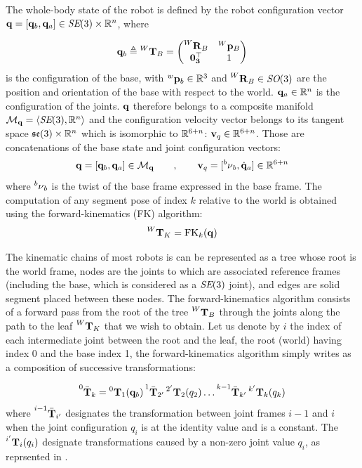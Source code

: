 The whole-body state of the robot is defined by the robot configuration vector ${\bf q}=[{\bf q}_b,{\bf q}_a]\in \textit{SE}(3) \times \mathbb{R}^n$, where 

\begin{equation}
    {\bf q}_b \triangleq \prescript{W}{}{{\bf T}}_{B} =  
    \begin{pmatrix}
        \prescript{W}{}{{\bf R}}_{B} & \prescript{W}{}{{\bf p}}_{B} \\
        \bf0_3^{\top} & 1
    \end{pmatrix}
\end{equation}
%
is the configuration of the base,
with $\prescript{w}{}{{\bf p}}_{b} \in \mathbb{R}^3$ and $\prescript{W}{}{{\bf R}}_{B} \in \textit{SO}(3)$ are the position and orientation of the base with respect to the world.
${\bf q}_a \in \mathbb{R}^n$ is the configuration of the joints. ${\bf q}$ therefore belongs to a composite manifold $\mathcal{M}_{{\bf q}} = \left<\textit{SE}(3), \mathbb{R}^n \right>$ and the configuration velocity vector belongs to its tangent space ${\mathfrak {se}}(3)\times \mathbb{R}^n$ which is isomorphic to $\mathbb{R}^{6+n}$: ${\bf v}_q \in \mathbb{R}^{6+n}$. Those are concatenations
of the base state and joint configuration vectors:
%
\begin{equation}
    {\bf q}= [{\bf q}_b, {\bf q}_a]\in \mathcal{M}_{{\bf q}}\quad\quad,
    \quad\quad
    {\bf v}_q= [\prescript{b}{}{\mathbf{\nu}}_b,\dot{{\bf q}}_a]  \in \mathbb{R}^{6+n}
    \label{eq:configuration}
\end{equation}
%
where $\prescript{b}{}{\mathbf{\nu}}_b$ is the twist of the base frame expressed in the base frame.
The computation of any segment pose of index $k$ relative to the world is obtained using the forward-kinematics (FK) algorithm:
%
\begin{equation}
    \prescript{W}{}{{\bf T}}_{K} = \text{FK}_k({\bf q})
\end{equation}

The kinematic chains of most robots is can be represented as a tree whose root is the world frame, nodes are the joints to which are associated reference frames (including the base, which is considered as a $\textit{SE}(3)$ joint), and edges are solid segment placed between these nodes.
The forward-kinematics algorithm consists of a forward pass from the root of the tree $\prescript{W}{}{{\bf T}}_{B}$ through the joints along the path to the leaf $\prescript{W}{}{{\bf T}}_{K}$ that we wish to obtain. Let us denote by $i$ the index of each intermediate joint between the root and the leaf, the root (world) having index 0 and the base index 1, the forward-kinematics algorithm simply writes as a composition of successive transformations:

\begin{equation}
    \prescript{0}{}{\bar{{\bf T}}}_{k} = \prescript{0}{}{{\bf T}}_{1}({\bf q}_b) \prescript{1}{}{\bar{{\bf T}}}_{2'}
    \prescript{2'}{}{{\bf T}}_{2}(q_2) \dots  \prescript{k-1}{}{\bar{{\bf T}}}_{k'} \prescript{k'}{}{{\bf T}}_{k}(q_k)
\end{equation}
%
where $\prescript{i-1}{}{\bar{{\bf T}}}_{i'}$ designates the transformation between joint frames $i-1$ and $i$ when the joint configuration $q_i$ is at the identity value and is a constant. 
The $\prescript{i'}{}{{\bf T}}_{i}(q_i)$ designate transformations caused by a non-zero joint value $q_i$, as reprsented in .

